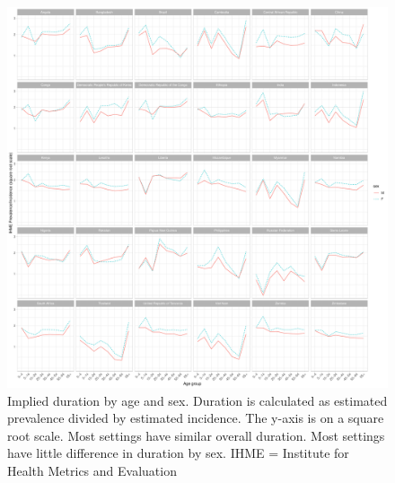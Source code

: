 \documentclass[12pt]{article}
\begin{document}
\begin{figure}
\centering
\includegraphics[width=1\textwidth]{../plots/aF5.pdf}
\caption[Implied duration by age and sex]{Implied duration by age and sex.
  Duration is calculated as estimated prevalence divided by estimated incidence.
The y-axis is on a square root scale. Most settings have similar overall
duration. Most settings have little difference in duration by sex. IHME = Institute for Health Metrics
and Evaluation}
\end{figure}

\FloatBarrier
\end{document}
